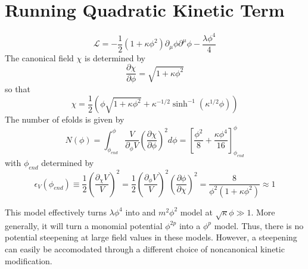 \documentclass{article}
\begin{document}
\section{Running Quadratic Kinetic Term}
\begin{equation}
  \mathcal{L} = -\frac{1}{2}(1+\kappa\phi^2)\partial_\mu\phi\partial^\mu\phi - \frac{\lambda\phi^4}{4}
\end{equation}
The canonical field $\chi$ is determined by
\begin{equation}
  \frac{\partial\chi}{\partial\phi} = \sqrt{1+\kappa\phi^2}
\end{equation}
so that
\begin{equation}
  \chi = \frac{1}{2}\left(\phi\sqrt{1+\kappa\phi^2} + \kappa^{-1/2}\sinh^{-1}(\kappa^{1/2}\phi) \right)
\end{equation}
The number of efolds is given by
\begin{equation}
  N(\phi) = \int_{\phi_{end}}^{\phi} \frac{V}{\partial_\phi V}\left(\frac{\partial \chi}{\partial \phi}\right)^2 d\phi = \left[\frac{\phi^2}{8} + \frac{\kappa\phi^4}{16} \right]_{\phi_{end}}^{\phi}
\end{equation}
with $\phi_{end}$ determined by
\begin{equation}
  \epsilon_V(\phi_{end}) \equiv \frac{1}{2}\left(\frac{\partial_\chi V}{V}\right)^2 = \frac{1}{2}\left(\frac{\partial_\phi V}{V}\right)^2\left(\frac{\partial \phi}{\partial \chi}\right)^2 = \frac{8}{\phi^2(1+\kappa\phi^2)} \approx 1
\end{equation}

This model effectively turns $\lambda\phi^4$ into and $m^2\phi^2$ model at $\sqrt{\kappa}\phi \gg 1$.  More generally, it will turn a monomial potential $\phi^{2p}$ into a $\phi^p$ model.  Thus, there is no potential steepening at large field values in these models.  However, a steepening can easily be accomodated through a different choice of noncanonical kinetic modification.
\end{document}

